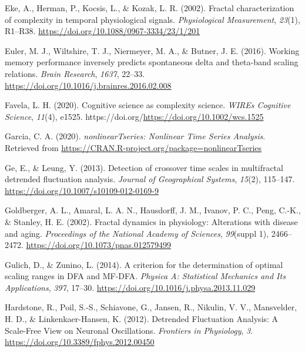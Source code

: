 \documentclass[
  man]{apa6}
\newlength{\cslhangindent}
\newlength{\cslentryspacingunit} %
\newenvironment{CSLReferences}[2] %
 {%
  \setlength{\parindent}{0pt}
  \ifodd #1
  \let\oldpar\par
  \def\par{\hangindent=\cslhangindent\oldpar}
  \fi
  \setlength{\parskip}{#2\cslentryspacingunit}
 }%
 {}
\begin{document}
\begin{CSLReferences}{1}{0}
\leavevmode{}%
Eke, A., Herman, P., Kocsis, L., \& Kozak, L. R. (2002). Fractal characterization of complexity in temporal physiological signals. \emph{Physiological Measurement}, \emph{23}(1), R1--R38. \url{https://doi.org/10.1088/0967-3334/23/1/201}

\leavevmode{}%
Euler, M. J., Wiltshire, T. J., Niermeyer, M. A., \& Butner, J. E. (2016). Working memory performance inversely predicts spontaneous delta and theta-band scaling relations. \emph{Brain Research}, \emph{1637}, 22--33. \url{https://doi.org/10.1016/j.brainres.2016.02.008}

\leavevmode{}%
Favela, L. H. (2020). Cognitive science as complexity science. \emph{WIREs Cognitive Science}, \emph{11}(4), e1525. https://doi.org/\url{https://doi.org/10.1002/wcs.1525}

\leavevmode{}%
Garcia, C. A. (2020). \emph{{nonlinearTseries}: {Nonlinear} {Time} {Series} {Analysis}}. Retrieved from \url{https://CRAN.R-project.org/package=nonlinearTseries}

\leavevmode{}%
Ge, E., \& Leung, Y. (2013). Detection of crossover time scales in multifractal detrended fluctuation analysis. \emph{Journal of Geographical Systems}, \emph{15}(2), 115--147. \url{https://doi.org/10.1007/s10109-012-0169-9}

\leavevmode{}%
Goldberger, A. L., Amaral, L. A. N., Hausdorff, J. M., Ivanov, P. C., Peng, C.-K., \& Stanley, H. E. (2002). Fractal dynamics in physiology: {Alterations} with disease and aging. \emph{Proceedings of the National Academy of Sciences}, \emph{99}(suppl 1), 2466--2472. \url{https://doi.org/10.1073/pnas.012579499}

\leavevmode{}%
Gulich, D., \& Zunino, L. (2014). A criterion for the determination of optimal scaling ranges in {DFA} and {MF}-{DFA}. \emph{Physica A: Statistical Mechanics and Its Applications}, \emph{397}, 17--30. \url{https://doi.org/10.1016/j.physa.2013.11.029}

\leavevmode{}%
Hardstone, R., Poil, S.-S., Schiavone, G., Jansen, R., Nikulin, V. V., Mansvelder, H. D., \& Linkenkaer-Hansen, K. (2012). Detrended {Fluctuation} {Analysis}: {A} {Scale}-{Free} {View} on {Neuronal} {Oscillations}. \emph{Frontiers in Physiology}, \emph{3}. \url{https://doi.org/10.3389/fphys.2012.00450}


\end{CSLReferences}
\end{document}
